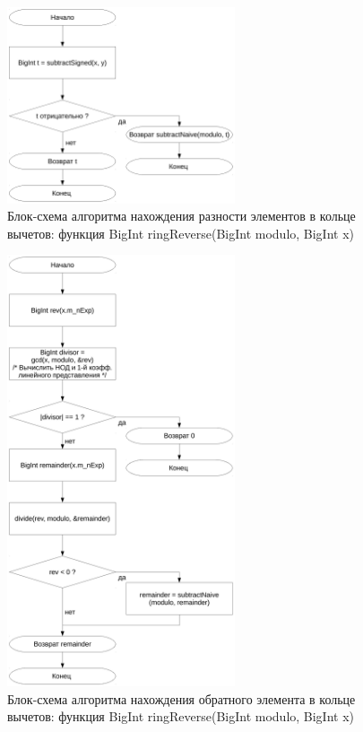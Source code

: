 \documentclass[a4paper,12pt]{article} %
\begin{document}
\begin{figure}[ht]
	\centering
	\includegraphics[width=0.6\textwidth]{lr5_subtractRing.pdf}
	\caption{
		Блок-схема алгоритма нахождения разности элементов в кольце вычетов:
		функция BigInt ringReverse(BigInt modulo, BigInt x)
	}
	\label{bs_minus}
\end{figure}

\begin{figure}[ht]
	\centering
	\includegraphics[width=0.6\textwidth]{lr5_ringReverse.pdf}
	\caption{
		Блок-схема алгоритма нахождения обратного элемента в кольце вычетов:
		функция BigInt ringReverse(BigInt modulo, BigInt x)
	}
	\label{bs_reverse}
\end{figure}
\end{document}
